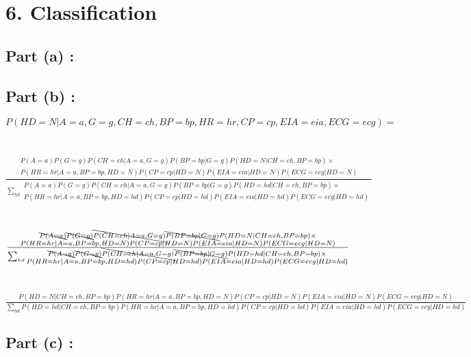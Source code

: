 \documentclass[a4paper,10pt]{report}
\begin{document}
\section*{6. Classification}
\subsection*{Part (a) :}
\subsection*{Part (b) :}
$P(HD = N | A = a, G = g, CH = ch, BP = bp, HR = hr, CP = cp, EIA = eia, ECG = ecg) = $ \\ \\ \\
$\frac{ \substack{P(A = a)P(G = g)P(CH = ch | A = a, G = g)P(BP = bp | G = g)P(HD = N | CH = ch, BP = bp) \times \\ P(HR = hr | A = a, BP = bp, HD = N)
    P(CP = cp | HD = N)P(EIA = eia | HD = N) P(ECG = ecg | HD = N)} }
    {\sum_{hd}{ \substack{P(A = a)P(G = g)P(CH = ch | A = a, G = g)P(BP = bp | G = g)P(HD = hd | CH = ch, BP = bp) \times \\P(HR = hr | A = a, BP = bp, HD = hd)
    P(CP = cp | HD = hd)P(EIA = eia | HD = hd) P(ECG = ecg | HD = hd)} } } $ \\ \\ \\
$\frac{ \substack{\bcancel{P(A = a)}\bcancel{P(G = g)}\bcancel{P(CH = ch | A = a, G = g)}\bcancel{P(BP = bp | G = g)}P(HD = N | CH = ch, BP = bp) \times \\ P(HR = hr | A = a, BP = bp, HD = N)
    P(CP = cp | HD = N)P(EIA = eia | HD = N) P(ECG = ecg | HD = N)} }
    {\sum_{hd}{ \substack{\bcancel{P(A = a)}\bcancel{P(G = g)}\bcancel{P(CH = ch | A = a, G = g)}\bcancel{P(BP = bp | G = g)}P(HD = hd | CH = ch, BP = bp) \times \\P(HR = hr | A = a, BP = bp, HD = hd)
    P(CP = cp | HD = hd)P(EIA = eia | HD = hd) P(ECG = ecg | HD = hd)} } } $ \\ \\ \\
$ \frac{P(HD = N| CH = ch, BP = bp)P(HR = hr | A = a, BP = bp, HD = N)P(CP = cp | HD = N)P(EIA = eia | HD = N)P(ECG = ecg | HD = N)}
    {\sum_{hd} P(HD = hd| CH = ch, BP = bp)P(HR = hr | A = a, BP = bp, HD = hd)P(CP = cp | HD = hd)P(EIA = eia | HD = hd)P(ECG = ecg | HD = hd)}
$
\subsection*{Part (c) : }
\end{document}
